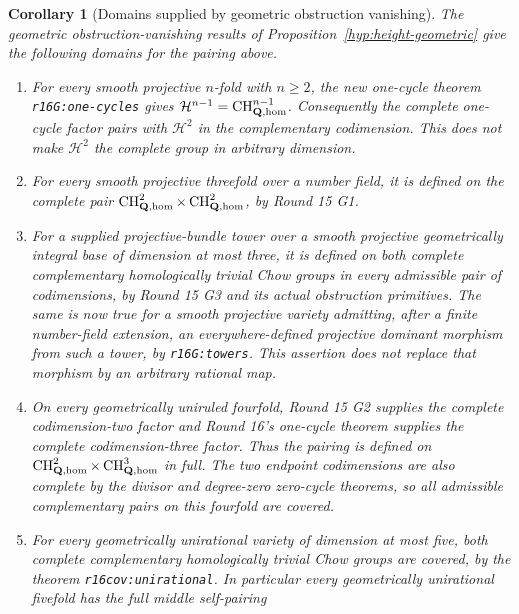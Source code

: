 \documentclass[11pt,a4paper]{article}
\newtheorem{corollary}[theorem]{Corollary}
\theoremstyle{definition}
\theoremstyle{remark}
\numberwithin{equation}{section}
\begin{document}
\begin{corollary}[Domains supplied by geometric obstruction vanishing]
\label{r16h:domains}
The geometric obstruction-vanishing results of Proposition~\ref{hyp:height-geometric} give the following domains for the pairing above.
\begin{enumerate}
\item For every smooth projective $n$-fold with $n\geq2$, the new
      one-cycle theorem \texttt{r16G:one-cycles} gives
      $\mathcal H^{n-1}=\operatorname{CH}^{n-1}_{\mathbf Q,\rm hom}$.
      Consequently the complete one-cycle factor pairs with
      $\mathcal H^2$ in the complementary codimension. This does not
      make $\mathcal H^2$ the complete group in arbitrary dimension.
\item For every smooth projective threefold over a number field, it
      is defined on the complete pair
      $\operatorname{CH}^2_{\mathbf Q,\rm hom}\times
       \operatorname{CH}^2_{\mathbf Q,\rm hom}$, by Round 15 G1.
\item For a supplied projective-bundle tower over a smooth projective
      geometrically integral base of dimension at most three, it is
      defined on both complete complementary homologically trivial
      Chow groups in every admissible pair of codimensions, by
      Round 15 G3 and its actual obstruction primitives. The same is
      now true for a smooth projective variety admitting, after a
      finite number-field extension, an everywhere-defined projective
      dominant morphism from such a tower, by
      \texttt{r16G:towers}. This assertion does not replace that
      morphism by an arbitrary rational map.
\item On every geometrically uniruled fourfold, Round 15 G2 supplies
      the complete codimension-two factor and Round 16's one-cycle
      theorem supplies the complete codimension-three factor. Thus
      the pairing is defined on
      $\operatorname{CH}^2_{\mathbf Q,\rm hom}\times
       \operatorname{CH}^3_{\mathbf Q,\rm hom}$ in full. The two
      endpoint codimensions are also complete by the divisor
      and degree-zero zero-cycle theorems, so all admissible
      complementary pairs on this fourfold are covered.
\item For every geometrically unirational variety of dimension at
      most five, both complete complementary homologically trivial
      Chow groups are covered, by the theorem \texttt{r16cov:unirational}. In particular every
      geometrically unirational fivefold has the full middle
      self-pairing

\end{enumerate}
\end{corollary}
\end{document}
